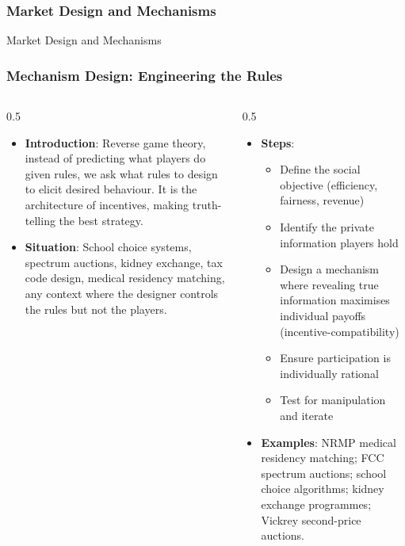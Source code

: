 \begin{frame}[fragile]\frametitle{Market Design and Mechanisms}
\begin{center}
{\Large Market Design and Mechanisms}
\end{center}
\end{frame}


\begin{frame}[fragile]\frametitle{Mechanism Design: Engineering the Rules}
\begin{columns}
    \begin{column}[T]{0.5\linewidth}
      \begin{itemize}
        \item \textbf{Introduction}: Reverse game theory, instead of predicting what players do given rules, we ask what rules to design to elicit desired behaviour. It is the architecture of incentives, making truth-telling the best strategy.
        \item \textbf{Situation}: School choice systems, spectrum auctions, kidney exchange, tax code design, medical residency matching, any context where the designer controls the rules but not the players.
      \end{itemize}
    \end{column}
    \begin{column}[T]{0.5\linewidth}
      \begin{itemize}
        \item \textbf{Steps}:
        \begin{itemize}
          \item Define the social objective (efficiency, fairness, revenue)
          \item Identify the private information players hold
          \item Design a mechanism where revealing true information maximises individual payoffs (incentive-compatibility)
          \item Ensure participation is individually rational
          \item Test for manipulation and iterate
        \end{itemize}\item \textbf{Examples}: NRMP medical residency matching; FCC spectrum auctions; school choice algorithms; kidney exchange programmes; Vickrey second-price auctions.
      \end{itemize}
    \end{column}
  \end{columns}
\end{frame}

